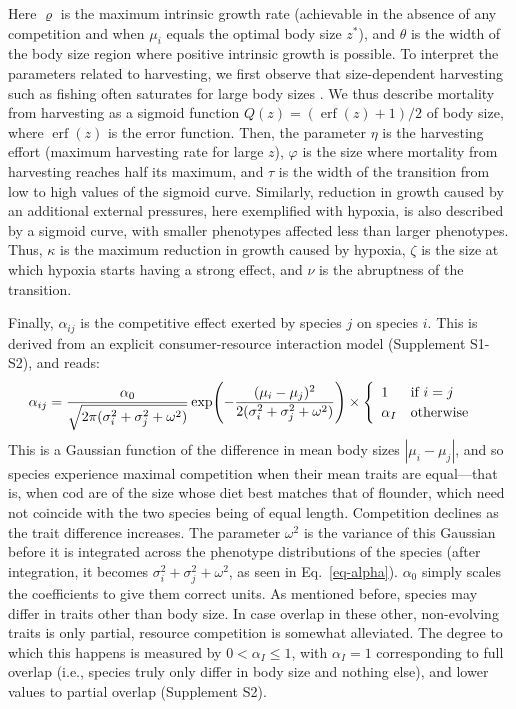 \documentclass[12pt]{article}
\DeclareMathOperator\erf{erf}
\let\originalleft\left
\let\originalright\right
\renewcommand{\left}{\mathopen{}\mathclose\bgroup\originalleft}
\renewcommand{\right}{\aftergroup\egroup\originalright}
\begin{document}
Here $\varrho$ is the maximum intrinsic growth rate (achievable in the absence of any competition and when $\mu_i$ equals the optimal body size $z^*$), and $\theta$ is the width of the body size region where positive intrinsic growth is possible. To interpret the parameters related to harvesting, we first observe that size-dependent harvesting such as fishing often saturates for large body sizes \citep{Brinkhof2020}. We thus describe mortality from harvesting as a sigmoid function $Q(z) = (\erf(z) + 1)/2$ of body size, where $\erf(z)$ is the error function. Then, the parameter $\eta$ is the harvesting effort (maximum harvesting rate for large $z$), $\varphi$ is the size where mortality from harvesting reaches half its maximum, and $\tau$ is the width of the transition from low to high values of the sigmoid curve. Similarly, reduction in growth caused by an additional external pressures, here exemplified with hypoxia, is also described by a sigmoid curve, with smaller phenotypes affected less than larger phenotypes. Thus, $\kappa$ is the maximum reduction in growth caused by hypoxia, $\zeta$ is the size at which hypoxia starts having a strong effect, and $\nu$ is the abruptness of the transition.

Finally, $\alpha_{ij}$ is the competitive effect exerted by species $j$ on species $i$. This is derived from an explicit consumer-resource interaction model (Supplement S1-S2), and reads:
\begin{equation}
  \label{eq-alpha}
  \alpha_{ij}
  = \frac{\alpha_0}
  {\sqrt{2\pi(\sigma_i^2 + \sigma_j^2 + \omega^2)}}
  \exp \left( -\frac{(\mu_i - \mu_j)^2}
  {2(\sigma_i^2 + \sigma_j^2 + \omega^2)} \right)
  \times
  \begin{cases}
    \begin{array}{ll}
      1 & \text{if~} i = j \\
      \alpha_I & \text{otherwise}
    \end{array}
  \end{cases}
\end{equation}
This is a Gaussian function of the difference in mean body sizes $|\mu_i - \mu_j|$, and so species experience maximal competition when their mean traits are equal---that is, when cod are of the size whose diet best matches that of flounder, which need not coincide with the two species being of equal length. Competition declines as the trait difference increases. The parameter $\omega^2$ is the variance of this Gaussian before it is integrated across the phenotype distributions of the species (after integration, it becomes $\sigma_i^2 + \sigma_j^2 + \omega^2$, as seen in Eq.~\ref{eq-alpha}). $\alpha_0$ simply scales the coefficients to give them correct units. As mentioned before, species may differ in traits other than body size. In case overlap in these other, non-evolving traits is only partial, resource competition is somewhat alleviated. The degree to which this happens is measured by $0 < \alpha_I \le 1$, with $\alpha_I = 1$ corresponding to full overlap (i.e., species truly only differ in body size and nothing else), and lower values to partial overlap (Supplement S2).
\end{document}
